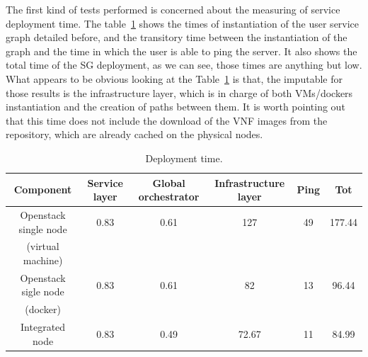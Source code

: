 The first kind of tests performed is concerned about the measuring of service deployment time. The table~\ref{tab:fg_istatiatiotion_evaluation}
shows the times of instantiation of the user service graph detailed before, and the transitory time between the instantiation of the graph and the time in which the user is able to ping the server. It also shows the total time of the SG deployment, as we can see, those times are anything but low. What appears to be obvious looking at the Table~\ref{tab:fg_istatiatiotion_evaluation} is that, the imputable for those results is the infrastructure layer, which is in charge of both VMs/dockers instantiation and the creation of paths between them.
It is worth pointing out that this time does not include the download of the VNF images from the repository, which are already cached on the physical nodes.
%
\renewcommand{\arraystretch}{1.5}
\begin{table}[htbp]
	\centering
	\tiny
	\caption{Deployment time.}
	\label{tab:fg_istatiatiotion_evaluation}
	\begin{tabular}{c|c|c|c|c|c}
		\textbf{Component} & Service layer & Global orchestrator & Infrastructure layer & Ping & \textbf{Tot} \\
		\hline	
		\hline

		Openstack single node & 0.83 & 0.61 & 127 & 49 & 177.44\\
		(virtual machine)  & & & & & \\
		\hline


		Openstack sigle node  & 0.83 & 0.61 & 82 & 13 & 96.44\\
		(docker) & & & & &\\
		\hline
		Integrated node & 0.83 & 0.49 & 72.67 & 11 & 84.99\\
		
		\hline 
	\end{tabular}
\end{table}


